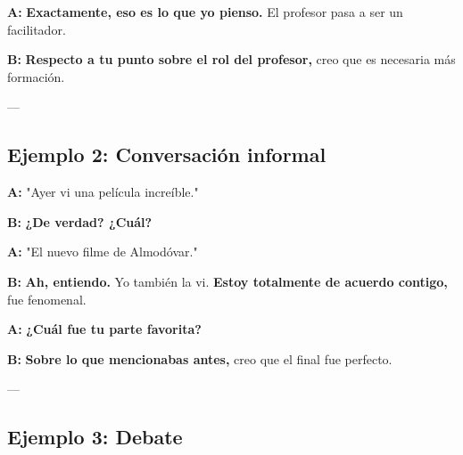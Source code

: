 \documentclass[a4paper,11pt]{article}
\begin{document}
\vspace{0.2cm}

\textbf{A:} \textbf{Exactamente, eso es lo que yo pienso.} El profesor pasa a ser un facilitador.

\vspace{0.2cm}

\textbf{B:} \textbf{Respecto a tu punto sobre el rol del profesor,} creo que es necesaria más formación.

\vspace{0.2cm}

---

\vspace{0.2cm}

\subsection{Ejemplo 2: Conversación informal}

\vspace{0.2cm}

\textbf{A:} "Ayer vi una película increíble."

\vspace{0.2cm}

\textbf{B:} \textbf{¿De verdad? ¿Cuál?}

\vspace{0.2cm}

\textbf{A:} "El nuevo filme de Almodóvar."

\vspace{0.2cm}

\textbf{B:} \textbf{Ah, entiendo.} Yo también la vi. \textbf{Estoy totalmente de acuerdo contigo,} fue fenomenal.

\vspace{0.2cm}

\textbf{A:} \textbf{¿Cuál fue tu parte favorita?}

\vspace{0.2cm}

\textbf{B:} \textbf{Sobre lo que mencionabas antes,} creo que el final fue perfecto.

\vspace{0.2cm}

---

\vspace{0.2cm}

\subsection{Ejemplo 3: Debate}
\end{document}
